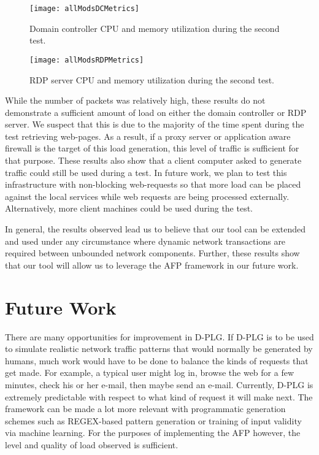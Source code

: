 \begin{figure}[!ht] \centering
  \texttt{[image: allModsDCMetrics]}
  \caption[Test 2:  Domain Controller Metrics]{Domain controller CPU and memory
  utilization during the second test.}
  \label{fig:allModsDCMetrics}
\end{figure}

\begin{figure}[!ht] \centering
  \texttt{[image: allModsRDPMetrics]}
  \caption[Test 2: RDP Metrics]{RDP server CPU and memory utilization during
  the second test.}
  \label{fig:allModsRDPMetrics}
\end{figure}

While the number of packets was relatively high, these results do not
demonstrate a sufficient amount of load on either the domain controller or RDP
server.  We suspect that this is due to the majority of the time spent during
the test retrieving web-pages.  As a result, if a proxy server or application
aware firewall is the target of this load generation, this level of traffic is
sufficient for that purpose.  These results also show that a client computer
asked to generate traffic could still be used during a test.  In future work,
we plan to test this infrastructure with non-blocking web-requests so that more
load can be placed against the local services while web requests are being
processed externally.  Alternatively, more client machines could be used during
the test.

In general, the results observed lead us to believe that our tool can be
extended and used under any circumstance where dynamic network transactions are
required between unbounded network components.  Further, these results show
that our tool will allow us to leverage the AFP framework in our future work.

\section{Future Work} \label{sec:futureWork}
There are many opportunities for improvement in D-PLG.  If D-PLG is to be used
to simulate realistic network traffic patterns that would normally be generated
by humans, much work would have to be done to balance the kinds of requests
that get made.  For example, a typical user might log in, browse the web for a
few minutes, check his or her e-mail, then maybe send an e-mail.  Currently,
D-PLG is extremely predictable with respect to what kind of request it will
make next.  The framework can be made a lot more relevant with programmatic
generation schemes such as REGEX-based pattern generation or training of input
validity via machine learning.  For the purposes of implementing the AFP
however, the level and quality of load observed is sufficient.

